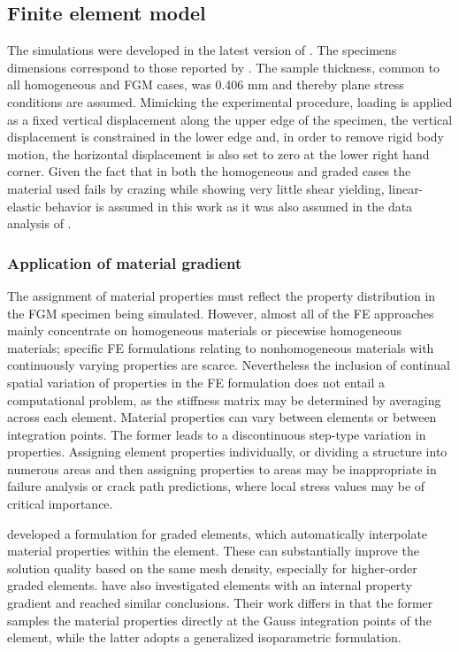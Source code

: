 \subsection{Finite element model}
\label{sec:model2}

The simulations were developed in the latest version of \cite{ABAQUS}. The specimens dimensions correspond to those reported by \cite{Abanto-Bueno2006}. The sample thickness, common to all homogeneous and FGM cases, was 0.406 mm and thereby plane stress conditions are assumed. Mimicking the experimental procedure, loading is applied as a fixed vertical displacement along the upper edge of the specimen, the vertical displacement is constrained in the lower edge and, in order to remove rigid body motion, the horizontal displacement is also set to zero at the lower right hand corner. Given the fact that in both the homogeneous and graded cases the material used fails by crazing while showing very little shear yielding, linear-elastic behavior is assumed in this work as it was also assumed in the data analysis of \cite{Abanto-Bueno2006}.

\subsubsection{Application of material gradient}
\label{sec:model21}

The assignment of material properties must reflect the property distribution in the FGM specimen being simulated. However, almost all of the FE approaches mainly concentrate on homogeneous materials or piecewise homogeneous materials; specific FE formulations relating to nonhomogeneous materials with continuously varying properties are scarce. Nevertheless the inclusion of continual spatial variation of properties in the FE formulation does not entail a computational problem, as the stiffness matrix may be determined by averaging across each element. Material properties can vary between elements or between integration points. The former leads to a discontinuous step-type variation in properties. Assigning element properties individually, or dividing a structure into numerous areas and then assigning properties to areas \citep{Bao1995} may be inappropriate in failure analysis or crack path predictions, where local stress values may be of critical importance.

\cite{Santare2000} developed a formulation for graded elements, which automatically interpolate material properties within the element. These can substantially improve the solution quality based on the same mesh density, especially for higher-order graded elements. \cite{Kimb2002} have also investigated elements with an internal property gradient and reached similar conclusions. Their work differs in that the former samples the material properties directly at the Gauss integration points of the element, while the latter adopts a generalized isoparametric formulation.
 
